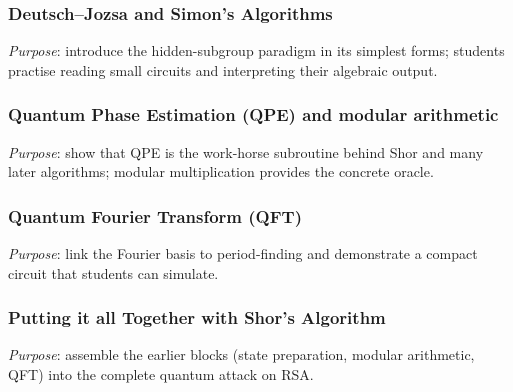 \subsubsection{Deutsch–Jozsa and Simon’s Algorithms}

\emph{Purpose}: introduce the hidden-subgroup paradigm in its simplest forms; 
students practise reading small circuits and interpreting their algebraic output.


\subsubsection{Quantum Phase Estimation (QPE) and modular arithmetic}

\emph{Purpose}: show that QPE is the work-horse subroutine behind Shor and many later algorithms; 
modular multiplication provides the concrete oracle.


\subsubsection{Quantum Fourier Transform (QFT)}

\emph{Purpose}: link the Fourier basis to period-finding 
and demonstrate a compact circuit that students can simulate.


\subsubsection{Putting it all Together with Shor's Algorithm}

\emph{Purpose}: assemble the earlier blocks 
(state preparation, modular arithmetic, QFT)
into the complete quantum attack on RSA.



